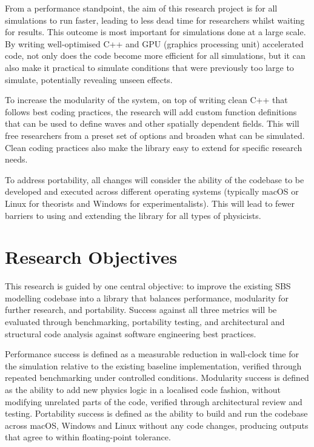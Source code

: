 From a performance standpoint, the aim of this research project is for all simulations to run faster, leading to less dead time for researchers whilst waiting for results. This outcome is most important for simulations done at a large scale. By writing well-optimised C++ and GPU (graphics processing unit) accelerated code, not only does the code become more efficient for all simulations, but it can also make it practical to simulate conditions that were previously too large to simulate, potentially revealing unseen effects.

To increase the modularity of the system, on top of writing clean C++ that follows best coding practices, the research will add custom function definitions that can be used to define waves and other spatially dependent fields. This will free researchers from a preset set of options and broaden what can be simulated. Clean coding practices also make the library easy to extend for specific research needs.

To address portability, all changes will consider the ability of the codebase to be developed and executed across different 
operating systems (typically macOS or Linux for theorists and Windows for experimentalists).
This will lead to fewer barriers to using and extending the library for all types of physicists.

\section{Research Objectives}

This research is guided by one central objective: to improve the existing SBS modelling codebase into a library that 
balances performance, modularity for further research, and portability. Success against all three metrics will be 
evaluated through benchmarking, portability testing, and architectural and structural code analysis against software 
engineering best practices.

Performance success is defined as a measurable reduction in wall-clock time for the simulation relative to the 
existing baseline implementation, verified through repeated benchmarking under controlled conditions. 
Modularity success is defined as the ability to add new physics logic in a localised code fashion, 
without modifying unrelated parts of the code, verified through architectural review and testing. Portability success is 
defined as the ability to build and run the codebase across macOS, Windows and Linux without any code changes, 
producing outputs that agree to within floating-point tolerance.

